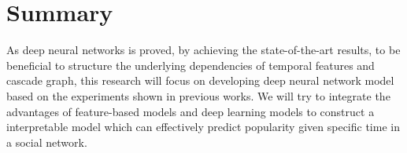 \section{Summary}

As deep neural networks is proved, by achieving the state-of-the-art results, to be beneficial to structure the underlying dependencies of temporal features and cascade graph, this research will focus on developing deep neural network model based on the experiments shown in previous works. We will try to integrate the advantages of feature-based models and deep learning models to construct a interpretable model which can effectively predict popularity given specific time in a social network.